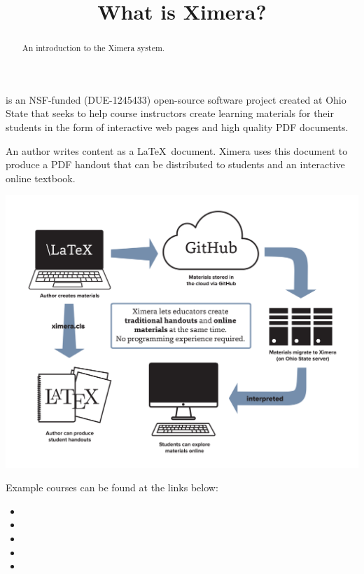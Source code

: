 \documentclass{ximera}
\title{What is Ximera?}
\begin{document}
\begin{abstract}
An introduction to the Ximera system.
\end{abstract}
\maketitle


 is an NSF-funded (DUE-1245433)
open-source software project created at Ohio State that seeks to help
course instructors create learning materials for their students in the
form of interactive web pages and high quality PDF documents.

An author writes content as a \LaTeX\ document.  Ximera uses this
document to produce a PDF handout that can be distributed to students
and an interactive online textbook.

\begin{image}
\includegraphics[scale=.25]{./XimeraGraphic.png}
\end{image}

Example courses can be found at the links below:

\begin{itemize}
\item {}
\item {}
\item {}
\item {}
\item {}
  
\end{itemize}
\end{document}

